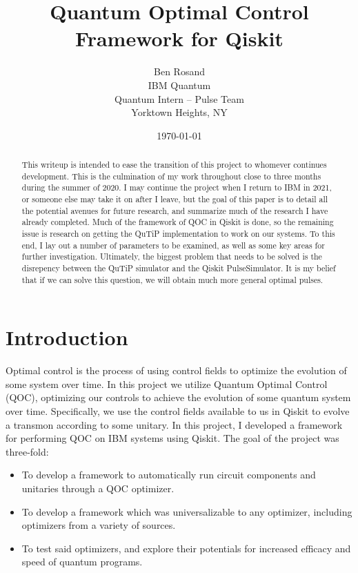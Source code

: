 \documentclass[12pt]{article}
\title{Quantum Optimal Control Framework for Qiskit}
\author{
        Ben Rosand \\
        IBM Quantum \\
        Quantum Intern -- Pulse Team\\
        Yorktown Heights, NY
}
\date{\today}
\begin{document}
\maketitle

\begin{abstract}
This writeup is intended to ease the transition of this project to whomever
continues development. This is the culmination of my work throughout close to
three months during the summer of 2020. I may continue the project when I return
to IBM in 2021, or someone else may take it on after I leave, but the goal of
this paper is to detail all the potential avenues for future research, and
summarize much of the research I have already completed. Much of the framework
of QOC in Qiskit is done, so the remaining issue is research on getting the
QuTiP implementation to work on our systems. To this end, I lay out a number of
parameters to be examined, as well as some key areas for further investigation.
Ultimately, the biggest problem that needs to be solved is the disrepency
between the QuTiP simulator and the Qiskit PulseSimulator. It is my belief that
if we can solve this question, we will obtain much more general optimal pulses.
\end{abstract}

\section{Introduction}

Optimal control is the process of using control fields to optimize the evolution
of some system over time. In this project we utilize Quantum Optimal Control (QOC),
optimizing our controls to achieve the evolution of some quantum system over
time. Specifically, we use the control fields available to us in Qiskit to
evolve a transmon according to some unitary. In this project, I developed a
framework for performing QOC on IBM systems using Qiskit. The goal of the project was three-fold:
\begin{itemize}
    \item To develop a framework to automatically run circuit components and
    unitaries through a QOC optimizer.
    \item To develop a framework which was universalizable to any optimizer,
    including optimizers from a variety of sources.
    \item To test said optimizers, and explore their potentials for increased
    efficacy and speed of quantum programs.
\end{itemize}
\end{document}
